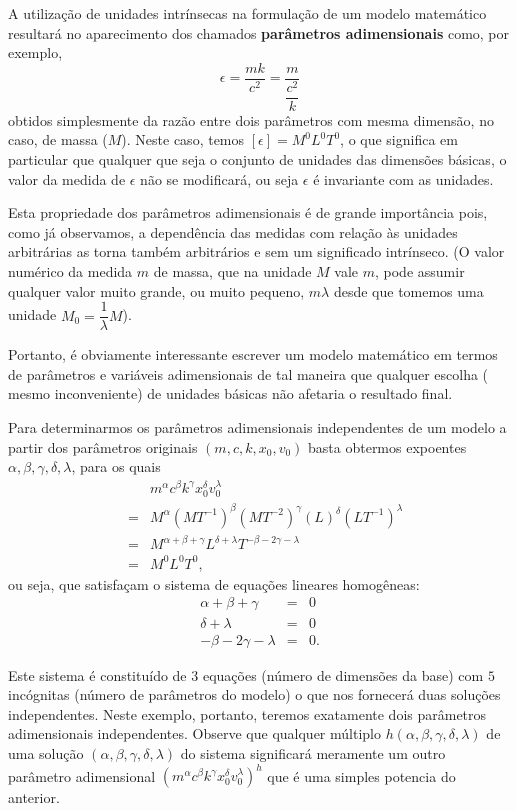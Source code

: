     A utilização de unidades intrínsecas na formulação de um modelo matemático resultará no aparecimento dos chamados \textbf{parâmetros adimensionais} como, por exemplo,
    \[\epsilon = \dfrac{mk}{c^{2}} = \dfrac{m}{\dfrac{c^2}{k}}\]
    obtidos simplesmente da razão entre dois parâmetros com mesma dimensão, no caso, de massa (\(M\)). Neste caso, temos \([\epsilon] = M^{0} L^{0} T^{0}\), o que significa em particular que qualquer que seja o conjunto de unidades das dimensões básicas, o valor da medida de \(\epsilon\) não se modificará, ou seja \(\epsilon\) é invariante com as unidades.

    Esta propriedade dos parâmetros adimensionais é de grande importância pois, como já observamos, a dependência das medidas com relação às unidades arbitrárias as torna também arbitrários e sem um significado intrínseco. (O valor numérico da medida \(m\) de massa, que na unidade \(M\) vale \(m\), pode assumir qualquer valor muito grande, ou muito pequeno, \(m\lambda\) desde que tomemos uma unidade \(M_0 = \dfrac{1}{\lambda} M\)).

    Portanto, é obviamente interessante escrever um modelo matemático em termos de parâmetros e variáveis adimensionais de tal maneira que qualquer escolha ( mesmo inconveniente) de unidades básicas não afetaria o resultado final.

    Para determinarmos os parâmetros adimensionais independentes de um modelo a partir dos parâmetros originais \((m, c, k, x_{0}, v_{0})\) basta obtermos expoentes \(\alpha, \beta, \gamma, \delta, \lambda\), para os quais
    \[\begin{array}{rcl}
    & & m^{\alpha} c^{\beta} k^{\gamma} x_0^{\delta} v_0^{\lambda} \\
    &=& M^{\alpha} (MT^{-1})^{\beta} (MT^{-2})^{\gamma} (L)^{\delta} (LT^{-1})^{\lambda} \\
    &=& M^{\alpha+\beta+\gamma} L^{\delta+\lambda} T^{-\beta-2\gamma-\lambda} \\
    &=& M^{0}L^{0}T^{0},
    \end{array}\]
    ou seja, que satisfaçam o sistema de equações lineares homogêneas:
    \[\begin{array}{rcl} \alpha+\beta+\gamma &=& 0 \\ \delta+\lambda &=& 0 \\ -\beta-2\gamma-\lambda &=& 0.\end{array}\]

    Este sistema é constituído de \(3\) equações (número de dimensões da base) com \(5\) incógnitas (número de parâmetros do modelo) o que nos fornecerá duas soluções independentes. Neste exemplo, portanto, teremos exatamente dois parâmetros adimensionais independentes. Observe que qualquer múltiplo \(h(\alpha, \beta, \gamma, \delta, \lambda)\) de uma solução \((\alpha, \beta, \gamma, \delta, \lambda)\) do sistema significará meramente um outro parâmetro adimensional \((m^{\alpha} c^{\beta} k^{\gamma} x_0^{\delta} v_0^{\lambda})^{h}\) que é uma simples potencia do anterior.


